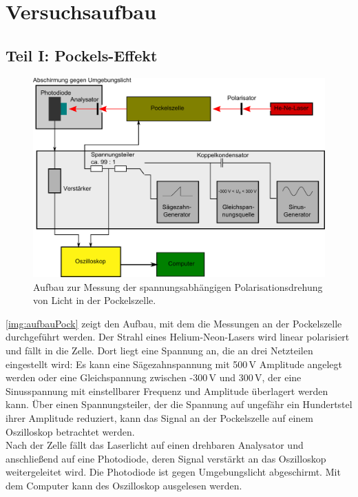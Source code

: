 \section{Versuchsaufbau}

\subsection{Teil I: Pockels-Effekt}
\begin{figure}[H]
\begin{center}
  \includegraphics[width=\textwidth]{../img/aufbauPock.pdf}
  \caption{Aufbau zur Messung der spannungsabhängigen Polarisationsdrehung von Licht in der Pockelszelle.}
  \label{img:aufbauPock}
\end{center}
\end{figure}
\autoref{img:aufbauPock} zeigt den Aufbau, mit dem die Messungen an der Pockelszelle durchgeführt werden.
Der Strahl eines Helium-Neon-Lasers wird linear polarisiert und fällt in die Zelle.
Dort liegt eine Spannung an, die an drei Netzteilen eingestellt wird:
Es kann eine Sägezahnspannung mit 500\,V Amplitude angelegt werden oder
eine Gleichspannung zwischen -300\,V und 300\,V,
der eine Sinusspannung mit einstellbarer Frequenz und Amplitude überlagert werden kann.
Über einen Spannungsteiler, der die Spannung auf ungefähr ein Hundertstel ihrer Amplitude reduziert,
kann das Signal an der Pockelszelle auf einem Oszilloskop betrachtet werden.\\
Nach der Zelle fällt das Laserlicht auf einen drehbaren Analysator und anschließend auf eine Photodiode,
deren Signal verstärkt an das Oszilloskop weitergeleitet wird.
Die Photodiode ist gegen Umgebungslicht abgeschirmt.
Mit dem Computer kann des Oszilloskop ausgelesen werden.


